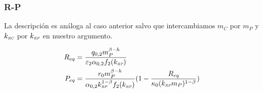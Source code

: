 \subsubsection{R-P}
La descripci\'on es an\'aloga al caso anterior salvo que intercambiamos $m_C$ por $m_P$ y $k_{\textit{\tiny RC}}$ por $k_{\textit{\tiny RP}}$ en nuestro argumento.

\begin{equation}
  \begin{aligned}
    R_{eq} &= \frac{q_{0,2} m_P^{\beta-h}}{\varepsilon_2 \alpha_{0,2} f_2(k_{\textit{\tiny RP}})}\\
    P_{eq} &= \frac{r_0 m_P^{\beta -h}}{\alpha_{0,2} k_{\textit{\tiny RP}}^{1 - \beta}f_2(k_{\textit{\tiny RP}})}(1 - \frac{R_{eq}}{\kappa_0 (k_{\textit{\tiny RP}}  m_P)^{1-\beta}})
  \end{aligned}
\end{equation}








